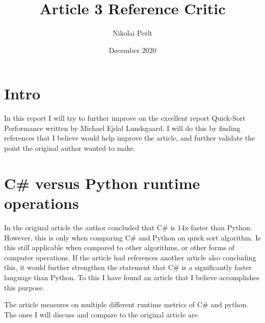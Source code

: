 \documentclass{article}
\title{Article 3 Reference Critic}
\author{Nikolai Perlt}
\date{December 2020}
\begin{document}
 \maketitle
\section*{Intro}
In this report I will try to further improve on the excellent report Quick-Sort Performance written by Michael Ejdal Lundsgaard\cite{pythonVsCSQuickSort}. I will do this by finding references that I believe would help improve the article, and further validate the point the original author wanted to make. 
 
\section*{C\# versus Python runtime operations}
In the original article the author concluded that C\# is 14x faster than Python. However, this is only when comparing C\# and Python on quick sort algorithm. Is this still applicable when compared to other algorithms, or other forms of computer operations. If the article had references another article also concluding this, it would further strengthen the statement that C\# is a significantly faster language than Python. To this I have found an article that I believe accomplishes this purpose\cite{karaci2015performance}. 
 
The article measures on multiple different runtime metrics of C\# and python. The ones I will discuss and compare to the original article are.
 
\end{document}
